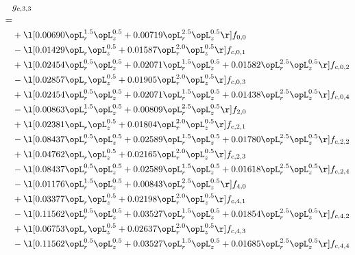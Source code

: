 \begin{alignat}{2} 
\label{eq:g_33_0} 
& g_{c,3,3} \nonumber \\ 
 = \\ 
& + \l[  0.00690 \opL_r^{1.5} \opL_z^{0.5} +  0.00719 \opL_r^{2.5} \opL_z^{0.5}  \r] f_{0,0} \nonumber \\ 
& - \l[  0.01429 \opL_r \opL_z^{0.5} +  0.01587 \opL_r^{2.0} \opL_z^{0.5}  \r] f_{c,0,1} \nonumber \\ 
& + \l[  0.02454 \opL_r^{0.5} \opL_z^{0.5} +  0.02071 \opL_r^{1.5} \opL_z^{0.5} +  0.01582 \opL_r^{2.5} \opL_z^{0.5}  \r] f_{c,0,2} \nonumber \\ 
& - \l[  0.02857 \opL_r \opL_z^{0.5} +  0.01905 \opL_r^{2.0} \opL_z^{0.5}  \r] f_{c,0,3} \nonumber \\ 
& + \l[  0.02454 \opL_r^{0.5} \opL_z^{0.5} +  0.02071 \opL_r^{1.5} \opL_z^{0.5} +  0.01438 \opL_r^{2.5} \opL_z^{0.5}  \r] f_{c,0,4} \nonumber \\ 
& - \l[  0.00863 \opL_r^{1.5} \opL_z^{0.5} +  0.00809 \opL_r^{2.5} \opL_z^{0.5}  \r] f_{2,0} \nonumber \\ 
& + \l[  0.02381 \opL_r \opL_z^{0.5} +  0.01804 \opL_r^{2.0} \opL_z^{0.5}  \r] f_{c,2,1} \nonumber \\ 
& - \l[  0.08437 \opL_r^{0.5} \opL_z^{0.5} +  0.02589 \opL_r^{1.5} \opL_z^{0.5} +  0.01780 \opL_r^{2.5} \opL_z^{0.5}  \r] f_{c,2,2} \nonumber \\ 
& + \l[  0.04762 \opL_r \opL_z^{0.5} +  0.02165 \opL_r^{2.0} \opL_z^{0.5}  \r] f_{c,2,3} \nonumber \\ 
& - \l[  0.08437 \opL_r^{0.5} \opL_z^{0.5} +  0.02589 \opL_r^{1.5} \opL_z^{0.5} +  0.01618 \opL_r^{2.5} \opL_z^{0.5}  \r] f_{c,2,4} \nonumber \\ 
& - \l[  0.01176 \opL_r^{1.5} \opL_z^{0.5} +  0.00843 \opL_r^{2.5} \opL_z^{0.5}  \r] f_{4,0} \nonumber \\ 
& + \l[  0.03377 \opL_r \opL_z^{0.5} +  0.02198 \opL_r^{2.0} \opL_z^{0.5}  \r] f_{c,4,1} \nonumber \\ 
& - \l[  0.11562 \opL_r^{0.5} \opL_z^{0.5} +  0.03527 \opL_r^{1.5} \opL_z^{0.5} +  0.01854 \opL_r^{2.5} \opL_z^{0.5}  \r] f_{c,4,2} \nonumber \\ 
& + \l[  0.06753 \opL_r \opL_z^{0.5} +  0.02637 \opL_r^{2.0} \opL_z^{0.5}  \r] f_{c,4,3} \nonumber \\ 
& - \l[  0.11562 \opL_r^{0.5} \opL_z^{0.5} +  0.03527 \opL_r^{1.5} \opL_z^{0.5} +  0.01685 \opL_r^{2.5} \opL_z^{0.5}  \r] f_{c,4,4} \nonumber \\ 
\end{alignat} 


